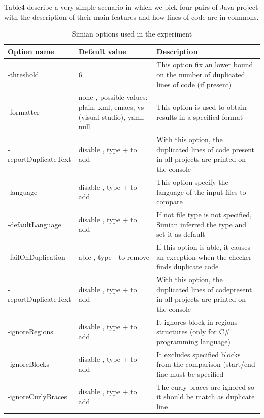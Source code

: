 Table4 describe a very simple scenario in which we pick four pairs of Java project with the description of their main features and how lines of code are in commons.

\begin{center}
\begin{table}[H]
  \caption{ Simian options used in the experiment }
  \label{Table:3}
\begin{adjustbox}{width=1\textwidth}
\small
\begin{tabular}{|l|p{4cm}|p{6cm}|}

\hline

 \textbf{Option name} & \textbf{Default value} & \textbf{Description} \\
\hline
 -threshold & 6 &This option fix an lower bound on the number   of duplicated lines of code (if present)  \\
\hline
-formatter &  none , possible values: plain, xml, emacs,    vs (visual studio), yaml, null &   This option is used to obtain results in a specified format\\
\hline
-reportDuplicateText & disable , type + to add &   With this option, the duplicated lines of code  present in all projects are printed on the console    \\
\hline
-language & disable , type + to add &  This option specify the  language of the input files to compare   \\
\hline
-defaultLanguage & disable , type + to add &   If not file type is not specified, Simian inferred the type and set it as default    \\
\hline
-failOnDuplication & able , type - to remove & If this option is able, it causes  an exception when the checker finds duplicate code     \\
\hline
-reportDuplicateText & disable , type + to add & With this option, the duplicated lines of codepresent in all projects are printed on the console    \\
\hline
-ignoreRegions & disable , type + to add & It ignores block in regions structures (only for C\# programming language)  \\
\hline
-ignoreBlocks & disable , type + to add &  It excludes specified blocks  from the comparison (start/end line must be specified  \\
\hline
-ignoreCurlyBraces & disable , type + to add & The curly braces are ignored  so it should be match as duplicate line \\


\end{tabular}
\end{adjustbox}
\end{table}
\end{center}
